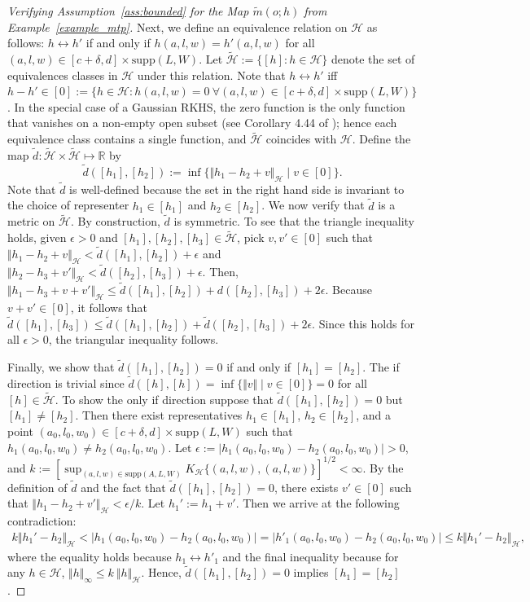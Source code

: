 \documentclass[twoside,11pt]{article}
\newcommand{\mc}{\mathcal}
\begin{document}
\begin{proof}[Verifying Assumption~\ref{ass:bounded} for the Map $\widetilde{m}(o;h)$ from Example~\ref{example_mtp}]
    Next, we define an equivalence relation on $\mc{H}$ as follows: $ h\leftrightarrow h'$ if and only if $h(a,l,w)=h'(a,l,w)$ for all $ (a,l,w)\in[c+\delta, d]\times\text{supp}(L,W)$. Let $\widetilde{\mc{H}}:=\{[h]:h\in\mc{H}\}$ denote the set of equivalences classes in $\mc{H}$ under this relation. Note that $h\leftrightarrow h'$ iff $h-h'\in[0]:=\{h\in\mc{H}:h(a,l,w)=0\:\forall (a,l,w)\in[c+\delta,d]\times\text{supp}(L,W)\}$. In the special case of a Gaussian RKHS, the zero function is the only function that vanishes on a non-empty open subset (see Corollary 4.44 of \cite{steinwart2008support}); hence each equivalence class contains a single function, and $\widetilde{\mc{H}}$ coincides with $\mc{H}$. Define the map $\tilde d:\widetilde{\mc{H}}\times\widetilde{\mc{H}}\mapsto\mathbb{R}$ by
    \[
    \tilde d([h_1],[h_2]):=\inf\{\Vert h_1-h_2+v\Vert_\mc{H}\mid v\in[0]\}.
    \]
    Note that $\tilde d$ is well-defined because the set in the right hand side is invariant to the choice of representer $h_1\in[h_1]$ and $h_2\in[h_2]$.
    We now verify that $\tilde d$ is a metric on $\widetilde{\mc{H}}$. By construction, $\tilde d$ is symmetric. To see that the triangle inequality holds, given $\epsilon >0$ and $[h_1],[h_2],[h_3]\in\widetilde{\mc{H}}$, pick $v,v'\in[0]$ such that $\Vert h_1-h_2+v\Vert_\mc{H} < \tilde d([h_1],[h_2]) + \epsilon$ and $\Vert h_2-h_3+v'\Vert_\mc{H} < \tilde d([h_2],[h_3]) + \epsilon$. Then, $\Vert h_1-h_3+v+v'\Vert_\mc{H} \le \tilde d([h_1],[h_2])+d([h_2],[h_3])+ 2 \epsilon$. Because $v+v'\in[0]$, it follows that $\tilde d([h_1],[h_3]) \le \tilde d([h_1],[h_2])+\tilde d([h_2],[h_3]) + 2 \epsilon$. Since this holds for all $\epsilon >0$, the triangular inequality follows.

    Finally, we show that $\tilde d([h_1],[h_2])=0$ if and only if $[h_1]=[h_2]$. The if direction is trivial since $\tilde d([h],[h])=\inf\{\Vert v\Vert\mid v\in[0]\}=0$ for all $[h]\in\widetilde{\mc{H}}$. To show the only if direction suppose that $\tilde d([h_1],[h_2])=0$ but $[h_1]\neq[h_2]$. Then there exist representatives $h_1\in[h_1]$, $h_2\in[h_2]$, and a point $(a_0,l_0,w_0)\in[c+\delta,d]\times\text{supp}(L,W)$ such that $ h_1(a_0,l_0,w_0)\neq h_2(a_0,l_0,w_0)$. Let $\epsilon:=|h_1(a_0,l_0,w_0)- h_2(a_0,l_0,w_0)|>0$, and $ k:=[\sup_{(a,l,w)\in\text{supp}(A,L,W)}K_{\mc{H}}\{(a,l,w),(a,l,w)\}]^{1/2}<\infty$. By the definition of $\tilde d$ and the fact that $\tilde d([h_1],[h_2])=0$, there exists $v'\in[0]$ such that $\Vert h_1-h_2+v'\Vert_\mc{H}<\epsilon/k$. Let $h_1':=h_1+v'$. Then we arrive at the following contradiction:
 \begin{align*}
        k\Vert h_1'-h_2\Vert_\mc{H}<|h_1(a_0,l_0,w_0)-h_2(a_0,l_0,w_0)|=|h'_1(a_0,l_0,w_0)-h_2(a_0,l_0,w_0)|\le k\Vert h_1'-h_2\Vert_\mc{H},
    \end{align*}
 where the equality holds because $h_1\leftrightarrow h'_1$ and the final inequality because for any $h\in\mc{H}$, $\Vert h\Vert_\infty\le k\:\Vert h\Vert_\mc{H}$. Hence, $\tilde d([h_1],[h_2])=0$ implies $[h_1]=[h_2]$.


\end{proof}
\end{document}
